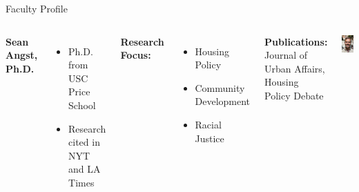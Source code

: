 \documentclass[10pt]{beamer}
\newlength{\imageheight}
\begin{document}
    \begin{frame}{Faculty Profile}
        \begin{columns}[t]
        \textbf{Sean Angst, Ph.D.}
        \begin{itemize}
        \item Ph.D. from USC Price School
        \item Research cited in NYT and LA Times
        \end{itemize}
        
        \textbf{Research Focus:}
        \begin{itemize}
        \item Housing Policy
        \item Community Development
        \item Racial Justice
        \end{itemize}
        
        \textbf{Publications:} Journal of Urban Affairs, Housing Policy Debate
        
        \vspace*{0.5cm}
        \includegraphics[height=\imageheight]{images/angst.jpg}
        \end{columns}
        \end{frame}
        
\end{document}
